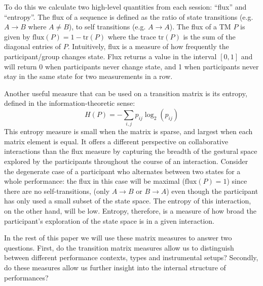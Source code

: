 \documentclass{sigchi}
\begin{document}
To do this we calculate two high-level quantities from each session:
``flux'' and ``entropy''. The flux of a sequence is defined as the
ratio of state transitions (e.g. $A \rightarrow B$ where $A \neq B$),
to self transitions (e.g. $A \rightarrow A $). The flux of a TM $P$ is
given by $\mathrm{flux}(P) = 1 - \mathrm{tr}(P)$ where the trace
$\mathrm{tr}(P)$ is the sum of the diagonal entries of $P$.
Intuitively, flux is a measure of how frequently the participant/group
changes state. Flux returns a value in the interval $[0,1]$ and will
return 0 when participants never change state, and 1 when participants
never stay in the same state for two measurements in a row.

Another useful measure that can be used on a transition matrix is its
entropy, defined in the information-theoretic\cite{Shannon:1948rt}
sense:
\begin{equation}
  H(P) = -\sum_{i,j}p_{ij}\log_2(p_{ij})
\end{equation}
This entropy measure is small when the matrix is sparse, and largest
when each matrix element is equal. It offers a different perspective
on collaborative interactions than the flux measure by capturing the
breadth of the gestural space explored by the participants throughout
the course of an interaction. Consider the degenerate case of a
participant who alternates between two states for a whole performance:
the flux in this case will be maximal ($\mathrm{flux}(P) = 1$) since
there are no self-transitions, (only $A \rightarrow B$ or
$ B \rightarrow A$) even though the participant has only used a small
subset of the state space. The entropy of this interaction, on the
other hand, will be low. Entropy, therefore, is a measure of how broad
the participant's exploration of the state space is in a given
interaction.

In the rest of this paper we will use these matrix measures to answer
two questions. First, do the transition matrix measures allow us to
distinguish between different performance contexts, types and
instrumental setups? Secondly, do these measures allow us further
insight into the internal structure of performances?

\end{document}
